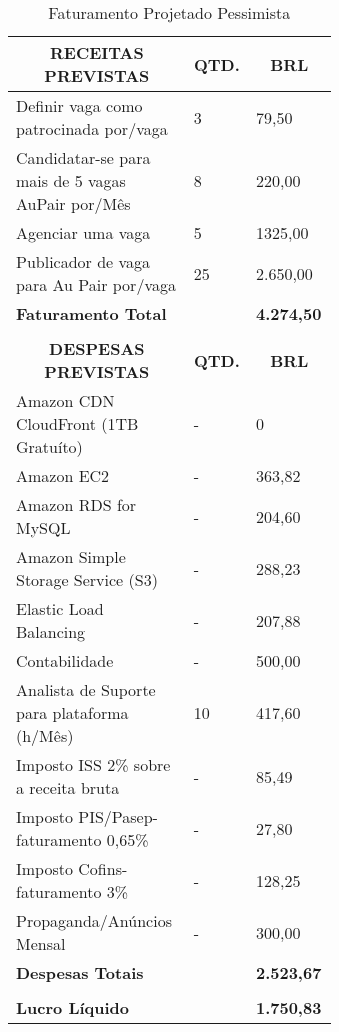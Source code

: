 \begin{enumerate}
    \begin{table}[H]
    \caption{Faturamento Projetado Pessimista}
    \label{faturamento-projetado-pessimista}
    	\centering\footnotesize
        \begin{tabular}{|p{0.50\linewidth} | p{0.04\linewidth} |  p{0.10\linewidth} |}  \hline

        \multicolumn{1}{|c|}{\textbf{RECEITAS PREVISTAS}} &
        \multicolumn{1}{|c|}{\textbf{QTD.}} &
        \multicolumn{1}{|c|}{\textbf{BRL}} \\ \hline


    Definir vaga como patrocinada por/vaga  & 3 & 79,50      \\ \hline
    Candidatar-se para mais de 5 vagas AuPair por/Mês     &  8 & 220,00     \\ \hline
    Agenciar uma vaga             &  5  & 1325,00          \\ \hline
    Publicador de vaga para Au Pair por/vaga     & 25  &   2.650,00     \\ \hline
    {\textbf{Faturamento Total}}   &   &   {\textbf{4.274,50}}           \\  \hline 


    &   &        \\ \hline
    \multicolumn{1}{|c|}{\textbf{DESPESAS PREVISTAS}} &
    \multicolumn{1}{|c|}{\textbf{QTD.}} &
    \multicolumn{1}{|c|}{\textbf{BRL}} \\ \hline

    Amazon CDN CloudFront (1TB Gratuíto) & - & 0 \\ \hline 
    Amazon EC2 & - & 363,82\\ \hline
    Amazon RDS for MySQL & - & 204,60 \\ \hline
    Amazon Simple Storage Service (S3) & - & 288,23 \\ \hline
    Elastic Load Balancing & - & 207,88 \\ \hline
    Contabilidade & - & 500,00 \\ \hline
    Analista de Suporte para plataforma (h/Mês) & 10 & 417,60  \\ \hline
    Imposto ISS 2\% sobre a receita bruta & - & 85,49  \\ \hline
    Imposto PIS/Pasep-faturamento 0,65\% & - & 27,80  \\ \hline
    Imposto Cofins-faturamento 3\% & - & 128,25  \\ \hline
    Propaganda/Anúncios Mensal    & - &  300,00  \\ \hline
    
    
    {\textbf{Despesas Totais}}   &   &   {\textbf{2.523,67}}           \\  \hline 


        & &   \\  \hline   
    {\textbf{Lucro Líquido}}   &   &   {\textbf{1.750,83}}           \\  \hline 

        \end{tabular}
    \end{table}
\end{enumerate}